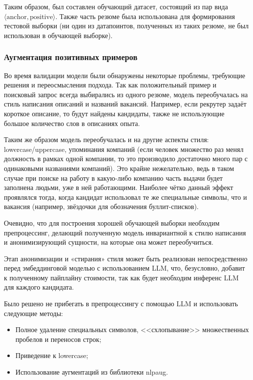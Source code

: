 \documentclass[14pt]{mmcs_article}
\begin{document}
Таким образом, был составлен обучающий датасет, состоящий из пар вида $\langle\text{anchor},\text{positive}\rangle$. Также часть резюме была использована для формирования тестовой выборки (ни один из датапоинтов, полученных из таких резюме, не был использован в обучающей выборке).

\subsubsection{Аугментация позитивных примеров}

Во время валидации модели были обнаружены некоторые проблемы, требующие решения и переосмысления подхода.
Так как положительный пример и поисковый запрос всегда выбирались из одного резюме, модель переобучалась на стиль написания описаний и названий вакансий. Например, если рекрутер задаёт короткое описание, то будут найдены кандидаты, также не использующие большое количество слов в описаниях опыта.

Таким же образом модель переобучалась и на другие аспекты стиля: lowercase/uppercase, упоминания компаний (если человек множество раз менял должность в рамках одной компании, то это производило достаточно много пар с одинаковыми названиями компаний). Это крайне нежелательно, ведь в таком случае при поиске на работу в какую-либо компанию часть выдачи будет заполнена людьми, уже в ней работающими. Наиболее чётко данный эффект проявлялся тогда, когда кандидат использовал те же специальные символы, что и вакансия (например, звёздочки для обозначения буллит-списков).

Очевидно, что для построения хорошей обучающей выборки необходим препроцессинг, делающий полученную модель инвариантной к стилю написания и анонимизирующий сущности, на которые она может переобучиться.

Этап анонимизации и «стирания» стиля может быть реализован непосредственно перед эмбеддинговой моделью с использованием LLM, что, безусловно, добавит к полученному пайплайну стоимости, так как будет необходим инференс LLM для каждого кандидата.

Было решено не прибегать в препроцессингу с помощью LLM и использовать следующие методы:

\begin{itemize}
  \item Полное удаление специальных символов, <<схлопывание>> множественных пробелов и переносов строк;
  \item Приведение к lowercase;
  \item Использование аугментаций из библиотеки nlpaug.
\end{itemize}
\end{document}
